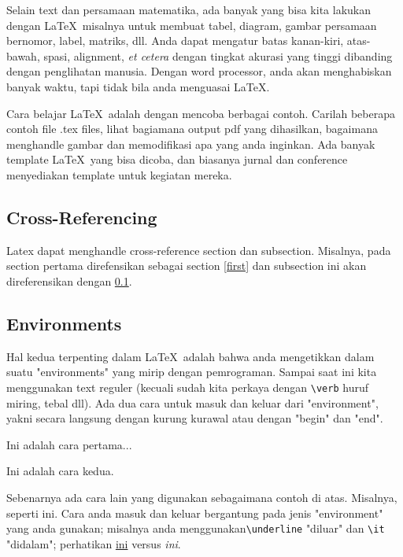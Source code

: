 \documentclass[12pt]{article}
\begin{document}
Selain text dan persamaan matematika, ada banyak yang bisa kita lakukan dengan \LaTeX\, misalnya untuk membuat tabel, diagram, gambar persamaan bernomor, label, matriks, dll. Anda dapat mengatur batas kanan-kiri, atas-bawah, spasi, alignment,  {\it et cetera} dengan tingkat akurasi yang tinggi dibanding dengan penglihatan manusia. Dengan word processor, anda akan menghabiskan banyak waktu, tapi tidak bila anda menguasai \LaTeX.

Cara belajar \LaTeX\ adalah dengan mencoba berbagai contoh. Carilah beberapa contoh file .tex files, lihat bagiamana output pdf yang dihasilkan, bagaimana menghandle gambar dan memodifikasi apa yang anda inginkan. Ada banyak template \LaTeX\ yang bisa dicoba, dan biasanya jurnal dan conference menyediakan template untuk kegiatan mereka.


\subsection{Cross-Referencing}
\label{subref}

Latex dapat menghandle cross-reference section dan subsection. Misalnya, pada section pertama direfensikan sebagai section \ref{first} dan subsection ini akan direferensikan dengan \ref{subref}.


\subsection{Environments}
\label{enviro}
Hal kedua terpenting dalam \LaTeX\ adalah bahwa anda mengetikkan dalam suatu "environments" yang mirip dengan pemrograman. 
Sampai saat ini kita menggunakan text reguler (kecuali sudah kita perkaya dengan  \verb|\verb| huruf miring, tebal dll).  Ada dua cara untuk masuk dan keluar dari "environment", yakni secara langsung dengan kurung kurawal atau dengan "begin" dan "end".
\vspace{1pc}

\centerline{Ini adalah cara pertama...}

\begin{center}
Ini adalah cara kedua.
\end{center}

\noindent Sebenarnya ada cara lain yang digunakan sebagaimana contoh di atas. Misalnya,
{\sc seperti ini}. Cara anda masuk dan keluar bergantung pada jenis "environment" yang anda gunakan; misalnya anda menggunakan\verb|\underline| "diluar" dan \verb|\it| "didalam"; 
perhatikan \underline{ini} versus {\it ini}.
\end{document}
